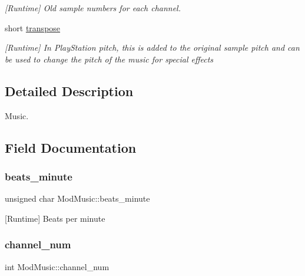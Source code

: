 \begin{DoxyCompactItemize}
\begin{DoxyCompactList}\small\item\em \mbox{[}Runtime\mbox{]} Old sample numbers for each channel. \end{DoxyCompactList}\item 
short \hyperlink{structModMusic_a08eaea3acf218f237d5cfcb05870d7fc}{transpose}
\begin{DoxyCompactList}\small\item\em \mbox{[}Runtime\mbox{]} In Play\+Station pitch, this is added to the original sample pitch and can be used to change the pitch of the music for special effects \end{DoxyCompactList}\end{DoxyCompactItemize}


\subsection{Detailed Description}
Music. 

\subsection{Field Documentation}
\mbox{\label{structModMusic_a69d46bccf5dd49685b43830ee03fbc3d}} 
\subsubsection{\texorpdfstring{beats\+\_\+minute}{beats\_minute}}
{\footnotesize\ttfamily unsigned char Mod\+Music\+::beats\+\_\+minute}



\mbox{[}Runtime\mbox{]} Beats per minute 

\mbox{\label{structModMusic_ae0ae287338ab6864050297cdf8fb9732}} 
\subsubsection{\texorpdfstring{channel\+\_\+num}{channel\_num}}
{\footnotesize\ttfamily int Mod\+Music\+::channel\+\_\+num}



